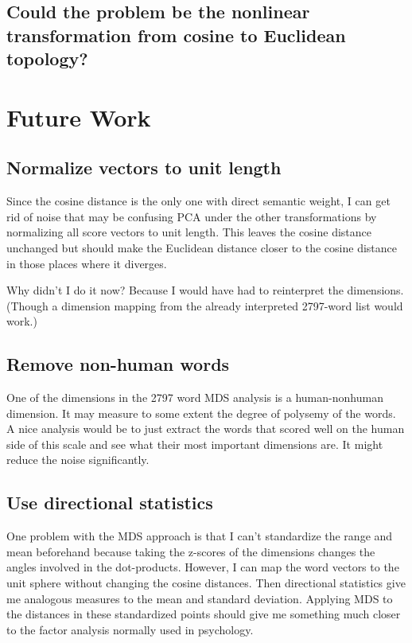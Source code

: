 \documentclass[eric_thesis.tex]{subfiles}
\begin{document}
\section{Could the problem be the nonlinear transformation from cosine to Euclidean topology?}

\chapter{Future Work}

\section{Normalize vectors to unit length}


Since the cosine distance is the only one with direct semantic weight, I can 
get rid of noise that may be confusing PCA under the other transformations by
normalizing all score vectors to unit length. This leaves the cosine distance
unchanged but should make the Euclidean distance closer to the cosine distance
in those places where it diverges.

Why didn't I do it now? Because I would have had to reinterpret the dimensions.
(Though a dimension mapping from the already interpreted 2797-word list would
work.)

\section{Remove non-human words}


One of the dimensions in the 2797 word MDS analysis is a human-nonhuman 
dimension. It may measure to some extent the degree of polysemy of the words. A 
nice analysis would be to just extract the words that scored well on the human 
side of this scale and see what their most important dimensions are. It might 
reduce the noise significantly.

\section{Use directional statistics}


One problem with the MDS approach is that I can't standardize the range and 
mean beforehand because taking the z-scores of the dimensions changes the 
angles involved in the dot-products. However, I can map the word vectors to 
the unit sphere without changing the cosine distances. Then directional 
statistics give me analogous measures to the mean and standard deviation. 
Applying MDS to the distances in these standardized points should give me 
something much closer to the factor analysis normally used in psychology.
\end{document}
